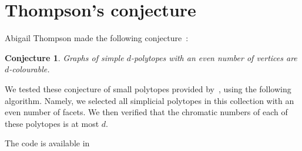 \documentclass[a4paper,12pt]{article}
\newtheorem{conjecture}{Conjecture}
\begin{document}
  \section{Thompson's conjecture}

   Abigail Thompson made the following conjecture~\parencite{kal14}:

  \begin{conjecture}
    Graphs of simple \(d\)-polytopes with an even number of vertices are \(d\)-colourable.
  \end{conjecture}

  We tested these conjecture of small polytopes provided by~\textcite{matroids}, using the following algorithm. Namely, we selected all simplicial polytopes in this collection with an even number of facets. We then verified that the chromatic numbers of each of these polytopes is at most \(d\).

  The code is available in \parencite{repo}

  \printbibliography
\end{document}
